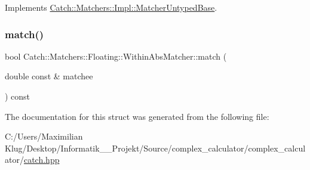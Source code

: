 Implements \mbox{\hyperlink{class_catch_1_1_matchers_1_1_impl_1_1_matcher_untyped_base_a91d3a907dbfcbb596077df24f6e11fe2}{Catch\+::\+Matchers\+::\+Impl\+::\+Matcher\+Untyped\+Base}}.

\mbox{\label{struct_catch_1_1_matchers_1_1_floating_1_1_within_abs_matcher_afa5d8eed57f12c1e5d006471eb0bfe72}} 
\subsubsection{\texorpdfstring{match()}{match()}}
{\footnotesize\ttfamily bool Catch\+::\+Matchers\+::\+Floating\+::\+Within\+Abs\+Matcher\+::match (\begin{DoxyParamCaption}\item[{double const \&}]{matchee }\end{DoxyParamCaption}) const\hspace{0.3cm}{\ttfamily [override]}}



The documentation for this struct was generated from the following file\+:\begin{DoxyCompactItemize}
\item 
C\+:/\+Users/\+Maximilian Klug/\+Desktop/\+Informatik\+\_\+\_\+\+Projekt/\+Source/complex\+\_\+calculator/complex\+\_\+calculator/\mbox{\hyperlink{catch_8hpp}{catch.\+hpp}}\end{DoxyCompactItemize}
